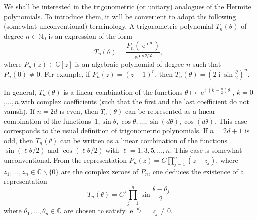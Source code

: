 \documentclass[10pt]{amsart}
\theoremstyle{definition}\newtheorem{defi}[theo]{Definition}\newtheorem{rema}[theo]{Remark}\newtheorem{exam}[theo]{Example}\newtheorem{exem}[theo]{Example}\newtheorem{nota}[theo]{Notation}
\DeclareMathOperator{\eee}{e}
\DeclareMathOperator{\ii}{i}
\newcommand{\N}{\mathbb{N}}
\newcommand{\C}{\mathbb{C}}
\begin{document}
We shall be interested in the trigonometric (or unitary) analogues of the Hermite polynomials. To introduce them, it will be convenient to adopt the following (somewhat unconventional) terminology. A trigonometric polynomial $T_n(\theta)$ of degree $n\in \N_0$ is an expression of the form
\begin{equation}\label{eq:algebraic_trigonometric}
T_n(\theta) = \frac{P_n(\eee^{\ii \theta})}{\eee^{\ii n \theta/2}},
\end{equation}
where $P_n(z)\in \C[z]$ is an algebraic polynomial of degree $n$ such that $P_n(0)\neq 0$. For example, if $P_n(z) = (z-1)^n$, then $T_n(\theta) = (2\ii \sin \frac \theta 2)^n$.

In general, $T_n(\theta)$ is a linear combination of the functions $\theta \mapsto \eee^{\ii (k-\frac n2) \theta}$, $k=0$,$\ldots, n$,\linebreak with complex coefficients (such that the first and the last coefficient do not vanish). If $n=2d$ is even, then $T_n(\theta)$ can be represented as a linear combination of the functions~$1, \sin \theta, \cos \theta,\ldots, \sin (d\theta), \cos (d\theta)$. This case corresponds to the usual definition of trigonometric polynomials. If $n=2d+1$ is odd, then $T_n(\theta)$ can be written as a linear combination of the functions $\sin (\ell \theta/2)$ and $\cos (\ell \theta/2)$ with $\ell = 1,3,5,\ldots, n$. This case is somewhat unconventional. From the representation $P_n(z) = C \prod_{j=1}^n (z-z_j)$, where $z_1,\ldots, z_n\in \C\backslash\{0\}$ are the complex zeroes of $P_n$, one deduces the existence of a representation
\[
T_n(\theta) = C' \prod_{j=1}^n \sin \frac {\theta - \theta_j} 2
\]
where $\theta_1,\ldots,\theta_n\in \C$ are chosen to satisfy $\eee^{\ii \theta_j} = z_j\neq 0$.
\end{document}
